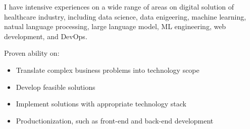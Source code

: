 \par{
    I have intensive experiences on a wide range of areas on digital solution of healthcare industry, including data science, data enigeering, machine learning, natual language processing, large language model, ML engineering, web development, and DevOps.
}
\par{
    Proven ability on:
    \begin{itemize}
        \item Translate complex business problems into technology scope
        \item Develop feasible solutions
        \item Implement solutions with appropriate technology stack
        \item Productionization, such as front-end and back-end development
    \end{itemize}
}